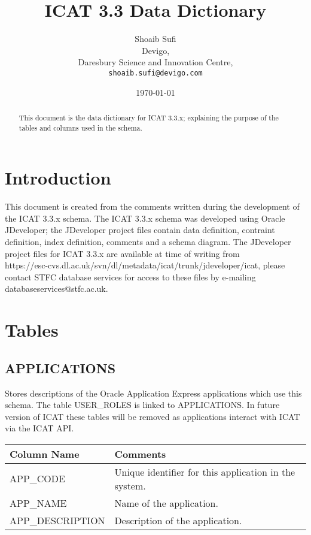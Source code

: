 \documentclass{report}
\begin{document}
\title{ICAT 3.3 Data Dictionary}
\author{Shoaib Sufi\\
 Devigo,\\
 Daresbury Science and Innovation Centre,\\
  \texttt{shoaib.sufi@devigo.com}}
\date{\today}
\maketitle
\begin{abstract}
This document is the data dictionary for ICAT 3.3.x; explaining the purpose of the tables and columns used in the schema.
\end{abstract}
\chapter{Introduction}
This document is created from the comments written during the development of the ICAT 3.3.x schema. The ICAT 3.3.x schema was developed using Oracle JDeveloper; the JDeveloper project files contain data definition, contraint definition, index definition, comments and a schema diagram. The JDeveloper project files for ICAT 3.3.x are available at time of writing from \\ https://esc-cvs.dl.ac.uk/svn/dl/metadata/icat/trunk/jdeveloper/icat, please contact STFC database services for access to these files by e-mailing databaseservices@stfc.ac.uk. 
\chapter{Tables}
\section{APPLICATIONS}

Stores descriptions of the Oracle Application Express applications which use this schema. The table USER\_ROLES is linked to APPLICATIONS. In future version of ICAT these tables will be removed as applications interact with ICAT via the ICAT API.\\

\begin{tabular}{|l|l|}
\hline
Column Name & Comments \\ \hline
APP\_CODE & \multicolumn{1}{p{100mm}|}{
Unique identifier for this application in the system.} \\ \hline
APP\_NAME & \multicolumn{1}{p{100mm}|}{
Name of the application.} \\ \hline
APP\_DESCRIPTION & \multicolumn{1}{p{100mm}|}{
Description of the application.} \\ \hline
\end{tabular}
\end{document}
